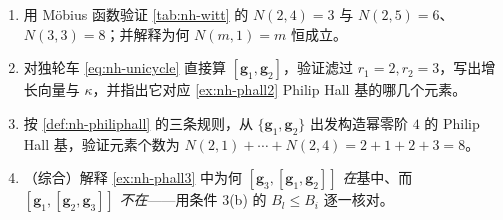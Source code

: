 \begin{practice}
\begin{enumerate}
  \item 用 Möbius 函数验证 \cref{tab:nh-witt} 的 $N(2,4)=3$ 与 $N(2,5)=6$、$N(3,3)=8$；并解释为何 $N(m,1)=m$ 恒成立。
  \item 对独轮车 \cref{eq:nh-unicycle} 直接算 $[\mathbf{g}_1,\mathbf{g}_2]$，验证滤过 $r_1=2,r_2=3$，写出增长向量与 $\kappa$，并指出它对应 \cref{ex:nh-phall2} Philip Hall 基的哪几个元素。
  \item 按 \cref{def:nh-philiphall} 的三条规则，从 $\{\mathbf{g}_1,\mathbf{g}_2\}$ 出发构造幂零阶 $4$ 的 Philip Hall 基，验证元素个数为 $N(2,1)+\cdots+N(2,4)=2+1+2+3=8$。
  \item （综合）解释 \cref{ex:nh-phall3} 中为何 $[\mathbf{g}_3,[\mathbf{g}_1,\mathbf{g}_2]]$ \emph{在}基中、而 $[\mathbf{g}_1,[\mathbf{g}_2,\mathbf{g}_3]]$ \emph{不在}——用条件 3(b) 的 $B_l\le B_i$ 逐一核对。
\end{enumerate}
\end{practice}
